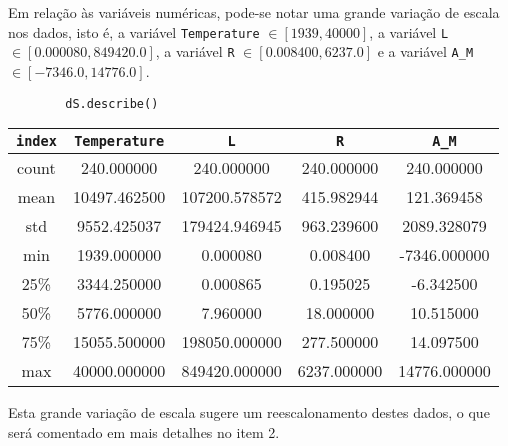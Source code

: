 Em relação às variáveis numéricas, pode-se notar uma grande variação de escala nos dados, isto é, a variável \verb|Temperature| $\in[1939, 40000]$, a variável \verb|L| $\in[0.000080, 849420.0]$, a variável \verb|R| $\in [0.008400, 6237.0]$ e a variável \verb|A_M| $\in [-7346.0, 14776.0]$. 
\begin{longlisting}
    \begin{verbatim}
        dS.describe()
    \end{verbatim}    
\end{longlisting}
\begin{table}[H]
    \centering
    \begin{tabular}{ccccc}
        \toprule
        \verb|index| & \verb|Temperature| & \verb|L| & \verb|R| & \verb|A_M|  \\ 
        \midrule
        count & 240.000000 & 240.000000 & 240.000000 & 240.000000 \\
        mean & 10497.462500 & 107200.578572 & 415.982944 & 121.369458 \\
        std & 9552.425037 & 179424.946945 & 963.239600 & 2089.328079 \\
        min & 1939.000000 & 0.000080 & 0.008400 & -7346.000000 \\
        25\% & 3344.250000 & 0.000865 & 0.195025 & -6.342500 \\
        50\% & 5776.000000 & 7.960000 & 18.000000 & 10.515000 \\
        75\% & 15055.500000 & 198050.000000 & 277.500000 & 14.097500 \\
        max & 40000.000000 & 849420.000000 & 6237.000000 & 14776.000000 \\
        \bottomrule
    \end{tabular}
\end{table}

Esta grande variação de escala sugere um reescalonamento destes dados, o que será comentado em mais detalhes no item 2. 

